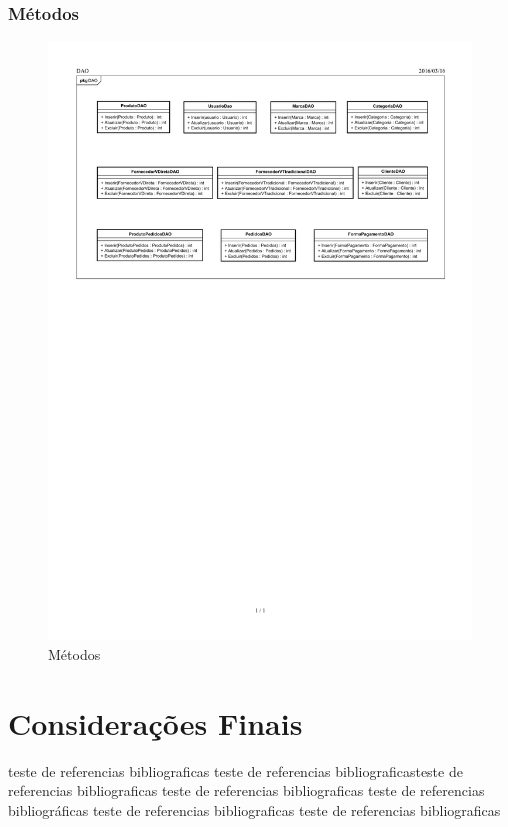 \documentclass[chapter=TITLE,12pt,oneside,a4paper,english,french,sumario=tradicional,spanish,brazil,]{abntex2}
\begin{document}
\subsection{Métodos}
\begin{figure}[h]\centering
\includegraphics[scale=0.96]{metodos.pdf}\caption{Métodos\label{met}}
\end{figure}


\chapter{Considerações Finais}
teste de referencias bibliograficas teste de referencias bibliograficasteste de referencias bibliograficas teste de referencias bibliograficas teste de referencias bibliográficas teste de referencias bibliograficas  teste de referencias bibliograficas
\end{document}
